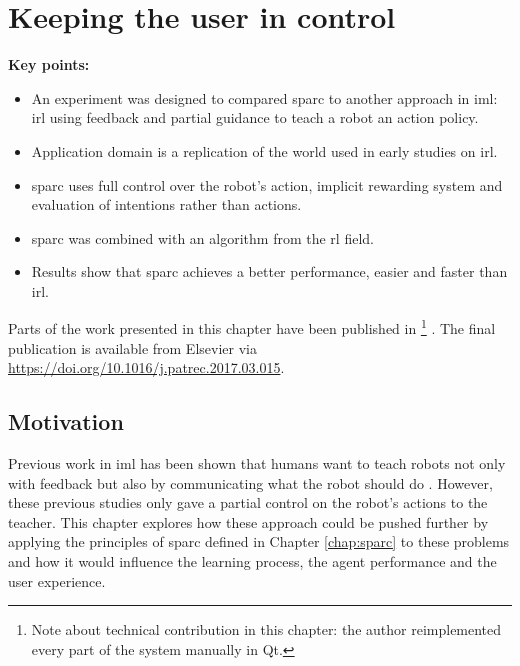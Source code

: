 \chapter{Keeping the user in control}\label{chap:control}

\graphicspath{{images/control/}}

\begin{framed}
	\textbf{Key points:}
	
	\begin{itemize}
		\item An experiment was designed to compared \gls{sparc} to another approach in \gls{iml}: \acrfull{irl} using feedback and partial guidance to teach a robot an action policy.
		\item Application domain is a replication of the world used in early studies on \acrshort{irl}.
		\item \gls{sparc} uses full control over the robot's action, implicit rewarding system and evaluation of intentions rather than actions.
		\item \gls{sparc} was combined with an algorithm from the \acrlong{rl} field.
		\item Results show that \gls{sparc} achieves a better performance, easier and faster than \acrshort{irl}.
	\end{itemize}
\end{framed}

Parts of the work presented in this chapter have been published in \cite{senft2017supervised} \footnote{Note about technical contribution in this chapter: the author reimplemented every part of the system manually in Qt.} . The final publication is available from Elsevier via \url{https://doi.org/10.1016/j.patrec.2017.03.015}.

\newpage
\section{Motivation}

Previous work in \gls{iml} has been shown that humans want to teach robots not only with feedback but also by communicating what the robot should do \citep{thomaz2008teachable}. However, these previous studies only gave a partial control on the robot's actions to the teacher. This chapter explores how these approach could be pushed further by applying the principles of \gls{sparc} defined in Chapter \ref{chap:sparc} to these problems and how it would influence the learning process, the agent performance and the user experience.

